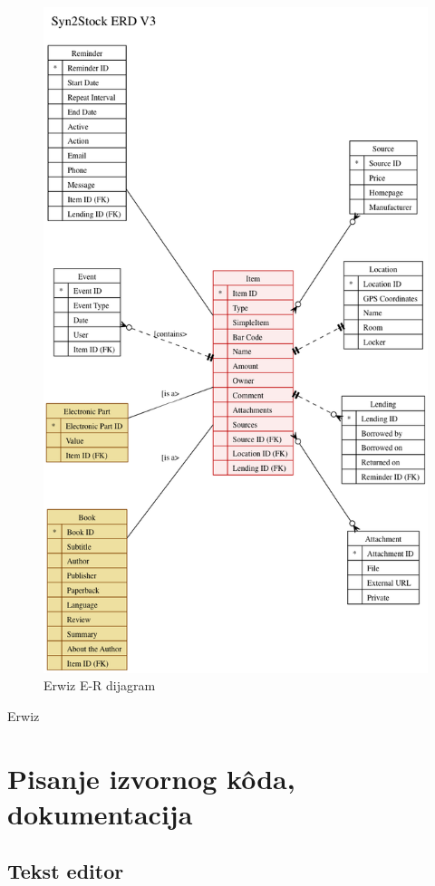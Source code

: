 \documentclass[times, utf8, seminar]{fit}
\begin{document}
\begin{figure}[H]
\centering
\includegraphics[width=12cm]{img/erwiz_example.png}
\caption{Erwiz E-R dijagram}
\end{figure}


Erwiz \href{http://code.google.com/p/knowhow-erp/downloads/list?can=2&q=erwiz}{\color{blue}{download}}

\chapter{Pisanje izvornog k\^oda, dokumentacija}

\section{Tekst editor}
\end{document}
